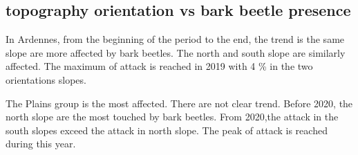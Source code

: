 \documentclass[3p,procedia]{elsarticle}
\begin{document}


	


\subsection{topography orientation vs bark beetle presence}

In Ardennes, from the beginning of the period to the end, the trend is the same slope are more affected by bark beetles. 
The north and south slope are similarly affected. 
The maximum of attack is reached in 2019 with 4 \% in the two orientations slopes.

The Plains group is the most affected. 
There are not clear trend. Before 2020, the north slope are the most touched by bark beetles.
From 2020,the attack in the south slopes exceed the attack in north slope. 
The peak of attack is reached during this year.
\end{document}
